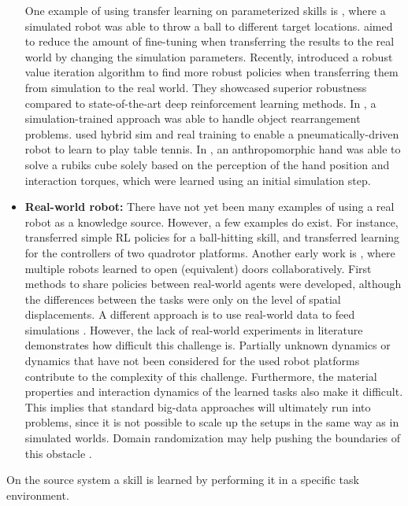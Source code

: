 \begin{itemize}
    One example of using transfer learning on parameterized skills is \cite{Metzen.2014}, where a simulated robot was able to throw a ball to different target locations. \cite{vanBaar.2019} aimed to reduce the amount of fine-tuning when transferring the results to the real world by changing the simulation parameters.
    Recently, \cite{Lutter.2022} introduced a robust value iteration algorithm to find more robust policies when transferring them from simulation to the real world.
    They showcased superior robustness compared to state-of-the-art deep reinforcement learning methods.
    In \cite{AhmedHQureshi.2021}, a simulation-trained approach was able to handle object rearrangement problems.
    \cite{buchler2022learning} used hybrid sim and real training to enable a pneumatically-driven robot to learn to play table tennis.
    In \cite{sievers2022learning}, an anthropomorphic hand was able to solve a rubiks cube solely based on the perception of the hand position and interaction torques, which were learned using an initial simulation step.
    \item \textbf{Real-world robot:} There have not yet been many examples of using a real robot as a knowledge source.
    However, a few examples do exist. For instance, \cite{Barrett.2010} transferred simple RL policies for a ball-hitting skill, and \cite{Helwa.2017} transferred learning for the controllers of two quadrotor platforms.
    Another early work is \cite{Gu.2017}, where multiple robots learned to open (equivalent) doors collaboratively.
    First methods to share policies between real-world agents were developed, although the differences between the tasks were only on the level of spatial displacements.
    A different approach is to use real-world data to feed simulations \cite{heiden2021bench}.
    However, the lack of real-world experiments in literature demonstrates how difficult this challenge is.
    Partially unknown dynamics or dynamics that have not been considered for the used robot platforms contribute to the complexity of this challenge.
    Furthermore, the material properties and interaction dynamics of the learned tasks also make it difficult.
    This implies that standard big-data approaches will ultimately run into problems, since it is not possible to scale up the setups in the same way as in simulated worlds.
    Domain randomization may help pushing the boundaries of this obstacle \cite{tobin2017domain}.
\end{itemize}
On the source system a skill is learned by performing it in a specific task environment.
